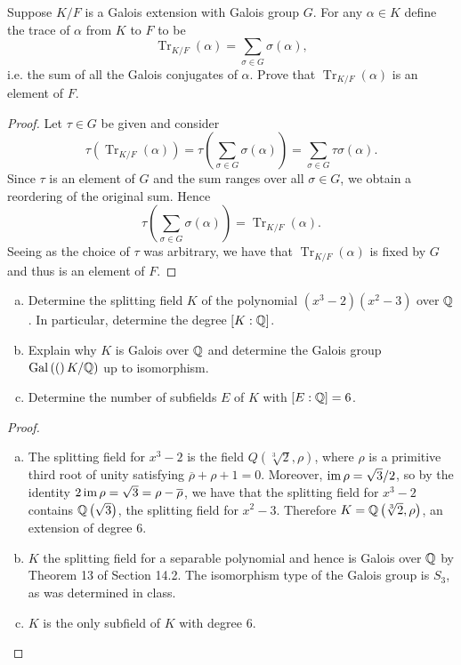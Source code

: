 \documentclass[10pt]{amsart}
\begin{document}
\begin{thm}
  \label{Ex6}
  \renewcommand{\Tr}{\operatorname{Tr}}
  Suppose $K/F$ is a Galois extension with Galois group $G$.
  For any $\alpha \in K$ define the trace of $\alpha$ from $K$ to $F$ to be $$\Tr_{K/F}(\alpha) = \sum_{\sigma \in G} \sigma(\alpha),$$
  i.e. the sum of all the Galois conjugates of $\alpha$.
  Prove that $\Tr_{K/F}(\alpha)$ is an element of $F$.
  
  \begin{proof}
    Let $\tau \in G$ be given and consider $$\tau(\Tr_{K/F}(\alpha)) = \tau\left(\sum_{\sigma \in G}\sigma(\alpha)\right) = \sum_{\sigma \in G} \tau\sigma(\alpha).$$
    Since $\tau$ is an element of $G$ and the sum ranges over all $\sigma \in G$, we obtain a reordering of the original sum.
    Hence $$\tau\left(\sum_{\sigma\in G} \sigma(\alpha)\right) = \Tr_{K/F}(\alpha).$$
    Seeing as the choice of $\tau$ was arbitrary, we have that $\Tr_{K/F}(\alpha)$ is fixed by $G$ and thus is an element of $F$.
  \end{proof}
\end{thm}

\begin{thm}
  \label{Ex7}
  \begin{enumerate}[(a)]
  \item
    Determine the splitting field $K$ of the polynomial $(x^3 - 2)(x^2 - 3)$ over $\mathbb{Q}$.
    In particular, determine the degree $[K:\mathbb{Q}]$.
  \item
    Explain why $K$ is Galois over $\mathbb{Q}$ and determine the Galois group $\operatorname{Gal}\left((\right)K/\mathbb{Q})$ up to isomorphism.
  \item
    Determine the number of subfields $E$ of $K$ with $[E:\mathbb{Q}] = 6$.
  \end{enumerate}

  \begin{proof}
    \begin{enumerate}[(a)]
    \item
      The splitting field for $x^3 - 2$ is the field $Q\left(\sqrt[3]{2},\rho\right)$, where $\rho$ is a primitive third root of unity satisfying $\overline{\rho} + \rho + 1 = 0$.
      Moreover, $\operatorname{im}{\rho} = \sqrt{3}/2$, so by the identity $2\operatorname{im}{\rho} = \sqrt{3} = \rho - \overline{\rho}$, we have that the splitting field for $x^3 - 2$ contains $\mathbb{Q}\left(\sqrt{3}\right)$, the splitting field for $x^2 - 3$.
      Therefore $K = \mathbb{Q}\left(\sqrt[3]{2},\rho\right)$, an extension of degree 6.
    \item
      $K$ the splitting field for a separable polynomial and hence is Galois over $\mathbb{Q}$ by Theorem 13 of Section 14.2.
      The isomorphism type of the Galois group is $S_3$, as was determined in class.
    \item
      $K$ is the only subfield of $K$ with degree 6.
    \end{enumerate}
  \end{proof}
\end{thm}
\end{document}
